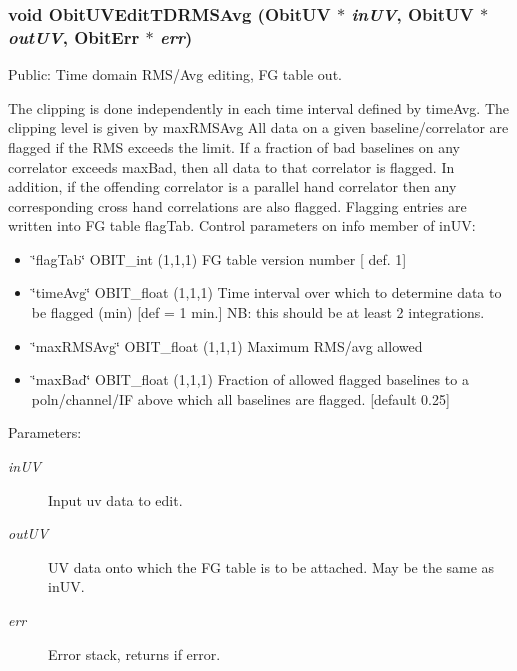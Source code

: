 \subsubsection{\setlength{\rightskip}{0pt plus 5cm}void Obit\-UVEdit\-TDRMSAvg ({\bf Obit\-UV} $\ast$ {\em in\-UV}, {\bf Obit\-UV} $\ast$ {\em out\-UV}, {\bf Obit\-Err} $\ast$ {\em err})}\label{ObitUVEdit_8h_a1}


Public: Time domain RMS/Avg editing, FG table out. 

The clipping is done independently in each time interval defined by time\-Avg. The clipping level is given by max\-RMSAvg All data on a given baseline/correlator are flagged if the RMS exceeds the limit. If a fraction of bad baselines on any correlator exceeds max\-Bad, then all data to that correlator is flagged. In addition, if the offending correlator is a parallel hand correlator then any corresponding cross hand correlations are also flagged. Flagging entries are written into FG table flag\-Tab. Control parameters on info member of in\-UV: \begin{itemize}
\item \char`\"{}flag\-Tab\char`\"{} OBIT\_\-int (1,1,1) FG table version number [ def. 1] \item \char`\"{}time\-Avg\char`\"{} OBIT\_\-float (1,1,1) Time interval over which to determine data to be flagged (min) [def = 1 min.] NB: this should be at least 2 integrations. \item \char`\"{}max\-RMSAvg\char`\"{} OBIT\_\-float (1,1,1) Maximum RMS/avg allowed \item \char`\"{}max\-Bad\char`\"{} OBIT\_\-float (1,1,1) Fraction of allowed flagged baselines to a poln/channel/IF above which all baselines are flagged. [default 0.25]\end{itemize}
\begin{Desc}
\item[Parameters:]
\begin{description}
\item[{\em in\-UV}]Input uv data to edit. \item[{\em out\-UV}]UV data onto which the FG table is to be attached. May be the same as in\-UV. \item[{\em err}]Error stack, returns if error. \end{description}
\end{Desc}
